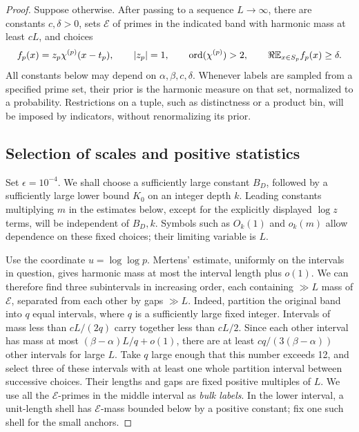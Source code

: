 \begin{proof}
Suppose otherwise. After passing to a sequence \(L\to\infty\),
there are constants \(c,\delta>0\), sets \(\mathcal E\) of primes in
the indicated band with harmonic mass at least \(cL\), and choices
\[
 f_p(x)=z_p\chi^{(p)}(x-t_p),\qquad
 |z_p|=1,\qquad \operatorname{ord}(\chi^{(p)})>2,
 \qquad \Re\mathbb E_{x\in S_p}f_p(x)\ge\delta .
\]
All constants below may depend on \(\alpha,\beta,c,\delta\).
Whenever labels are sampled from a specified prime set, their prior
is the harmonic measure on that set, normalized to a probability.
Restrictions on a tuple, such as distinctness or a product bin,
will be imposed by indicators, without renormalizing its prior.

\subsection*{Selection of scales and positive statistics}

Set \(\epsilon=10^{-4}\). We shall choose a sufficiently large
constant \(B_D\), followed by a sufficiently large lower bound \(K_0\)
on an integer depth \(k\). Leading constants multiplying \(m\) in
the estimates below, except for the explicitly displayed
\(\log z\) terms, will be independent of \(B_D,k\). Symbols such as
\(O_k(1)\) and \(o_k(m)\) allow dependence on these fixed choices;
their limiting variable is \(L\).

Use the coordinate \(u=\log\log p\). Mertens' estimate, uniformly
on the intervals in question, gives harmonic mass at most the
interval length plus \(o(1)\). We can therefore find three
subintervals in increasing order, each containing \(\gg L\) mass
of \(\mathcal E\), separated from each other by gaps \(\gg L\).
Indeed, partition the original band into \(q\) equal intervals,
where \(q\) is a sufficiently large fixed integer. Intervals of
mass less than \(cL/(2q)\) carry together less than \(cL/2\).
Since each other interval has mass at most
\((\beta-\alpha)L/q+o(1)\), there are at least
\(cq/(3(\beta-\alpha))\) other intervals for large \(L\).
Take \(q\) large enough that this number exceeds 12, and select
three of these intervals with at least one whole partition
interval between successive choices. Their lengths and gaps
are fixed positive multiples of \(L\).
We use all the \(\mathcal E\)-primes in the middle interval as
\emph{bulk labels}. In the lower interval, a unit-length shell
has \(\mathcal E\)-mass bounded below by a positive constant;
fix one such shell for the small anchors.


\end{proof}
